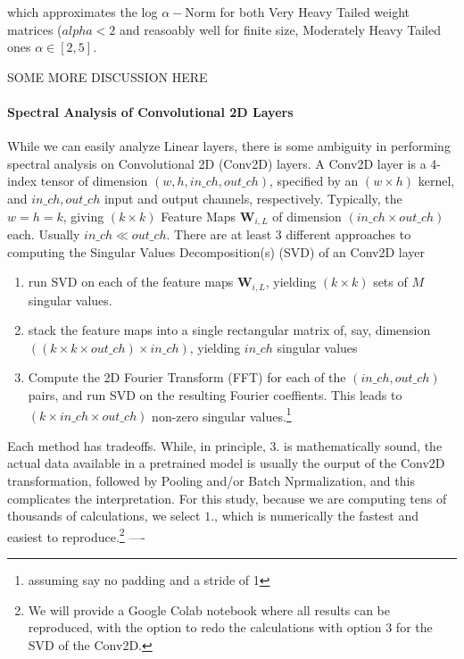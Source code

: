 which approximates the log $\alpha-$Norm for both Very Heavy Tailed weight matrices ($alpha < 2$  and reasoably well for finite size, Moderately Heavy Tailed ones $\alpha\in[2,5]$.  


SOME MORE DISCUSSION HERE


\paragraph{Spectral Analysis of Convolutional 2D Layers}
While we can easily analyze Linear layers, there is some ambiguity in performing spectral analysis on Convolutional 2D (Conv2D) layers.  A Conv2D layer is a 4-index tensor of dimension $(w,h,in\_ch,out\_ch)$, specified by an $(w\times h)$ kernel, and $in\_ch,out\_ch$ input and output channels, respectively.  Typically, the $w=h=k$, giving $(k\times k)$ Feature Maps $\mathbf{W}_{i,L}$
of dimension $(in\_ch\times out\_ch)$ each.  Usually $in\_ch\ll out\_ch$.
There are at least 3 different approaches to computing the Singular Values Decomposition(s) (SVD) of an Conv2D layer
\begin{enumerate}
\item run SVD on each of the feature maps $\mathbf{W}_{i,L}$, yielding $(k\times k)$ sets of $M$ singular values. 
\item stack the feature maps into a single rectangular matrix of, say, dimension $((k\times k\times out\_ch)\times in\_ch)$, yielding $in\_ch$ singular values
\item Compute the 2D Fourier Transform (FFT) for each of the $(in\_ch, out\_ch)$ pairs, and run SVD on the resulting Fourier coeffients\cite{Long2019}.  This leads to $(k\times in\_ch\times out\_ch)$ non-zero singular values.\footnote{assuming say no padding and a stride of 1}
\end{enumerate}

Each method has tradeoffs.  While, in principle, 3. is mathematically sound, the actual data available
in a pretrained model is usually the ourput of the Conv2D transformation, followed by Pooling and/or Batch Nprmalization,
and this complicates the interpretation.  For this study, because we are computing tens of thousands of calculations,  
we select $1.$, which is numerically the fastest and easiest to reproduce.\footnote{We will provide a Google Colab notebook where all results can be reproduced, with the option to redo the calculations with option 3 for the SVD of the Conv2D.}
----








